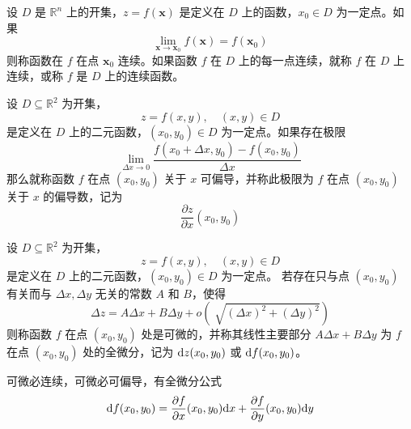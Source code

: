 \documentclass{ctexbook}
\def\diff{\textnormal{d}}
\begin{document}
\begin{definition}[多元函数的连续性]
    设 $D$ 是 $\mathbb{R}^n$ 上的开集，$z=f(\boldsymbol{x})$ 是定义在 $D$ 上的函数，$x_0\in D$ 为一定点。如果
    \begin{equation}
        \lim_{\boldsymbol{x}\rightarrow\boldsymbol{x}_0}f(\boldsymbol{x})=f(\boldsymbol{x}_0)
    \end{equation}
    则称函数在 $f$ 在点 $\boldsymbol{x}_0$ 连续。如果函数 $f$ 在 $D$ 上的每一点连续，就称 $f$ 在 $D$ 上连续，或称 $f$ 是 $D$ 上的连续函数。
\end{definition}

\begin{definition}[偏导数]
    设 $D\subseteq\mathbb{R}^2$ 为开集，
    \begin{equation*}
        z=f(x,y),\quad (x,y)\in D
    \end{equation*}
    是定义在 $D$ 上的二元函数，$(x_0,y_0)\in D$ 为一定点。如果存在极限
    \begin{equation}
        \lim_{\Delta x\rightarrow 0}\frac{f(x_0+\Delta x,y_0)-f(x_0,y_0)}{\Delta x}
    \end{equation}
    那么就称函数 $f$ 在点 $(x_0,y_0)$ 关于 $x$ 可偏导，并称此极限为 $f$ 在点 $(x_0,y_0)$ 关于 $x$ 的偏导数，记为
    \begin{equation}
        \frac{\partial z}{\partial x}(x_0,y_0)
    \end{equation}
\end{definition}

\begin{definition}[全微分]
    设 $D\subseteq\mathbb{R}^2$ 为开集，
    \begin{equation*}
        z=f(x,y),\quad (x,y)\in D
    \end{equation*}
    是定义在 $D$ 上的二元函数，$(x_0,y_0)\in D$ 为一定点。
    若存在只与点 $(x_0,y_0)$ 有关而与 $\Delta x,\Delta y$ 无关的常数 $A$ 和 $B$，使得
    \begin{equation}
        \Delta z=A\Delta x+B\Delta y+o\left(\sqrt[]{(\Delta x)^2+(\Delta y)^2}\right)
    \end{equation}
    则称函数 $f$ 在点 $(x_0,y_0)$ 处是可微的，并称其线性主要部分 $A\Delta x+B\Delta y$ 为 $f$ 在点 $(x_0,y_0)$ 处的全微分，记为 $\diff z(x_0,y_0)$ 或 $\diff f(x_0,y_0)$。
\end{definition}

\begin{theorem}[全微分公式]
    可微必连续，可微必可偏导，有全微分公式
    \begin{equation}
        \diff f(x_0,y_0)=\frac{\partial f}{\partial x}(x_0,y_0)\diff x + \frac{\partial f}{\partial y}(x_0,y_0)\diff y
    \end{equation}
\end{theorem}
\end{document}
